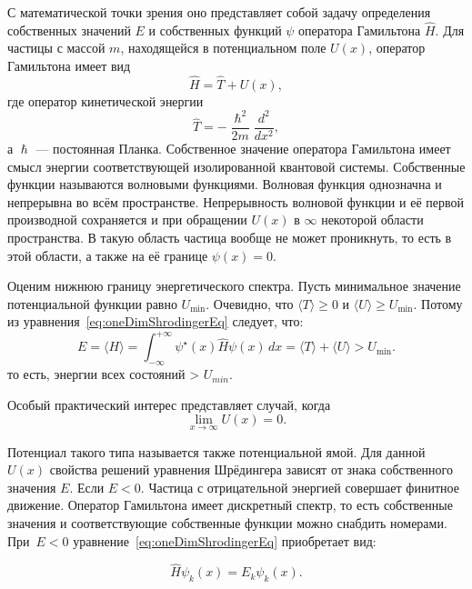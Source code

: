 \documentclass[a4paper,12pt]{article}
\begin{document}
С математической точки зрения оно представляет собой задачу определения собственных значений $E$ и собственных функций $\psi$ оператора Гамильтона $\hat{H}$.
Для частицы с массой $m$, находящейся в потенциальном поле $U(x)$, оператор Гамильтона имеет вид
\begin{equation}
    \hat{H} = \hat{T}+ U(x),
    \label{eq:gamilton_op}
\end{equation}
где оператор кинетической энергии
\begin{equation}
    \hat{T} =-\frac{\hslash^2}{2m}\frac{d^2}{dx^2},
    \label{eq:gamilton_kinetic_e_op}
\end{equation}
а $\hslash$ --- постоянная Планка.
Собственное значение оператора Гамильтона имеет смысл энергии соответствующей изолированной квантовой системы.
Собственные функции называются волновыми функциями.
Волновая функция однозначна и непрерывна во всём пространстве.
Непрерывность волновой функции и её первой производной сохраняется и при обращении $U(x)$ в $\infty$ некоторой области пространства.
В такую область частица вообще не может проникнуть, то есть в этой области, а также на её границе $\psi(x)=0$.

Оценим нижнюю границу энергетического спектра.
Пусть минимальное значение потенциальной функции равно $U_{\min}$.
Очевидно, что $\langle T \rangle \geq 0$ и $\langle U \rangle \geq U_{\min}$.
Потому из уравнения~\eqref{eq:oneDimShrodingerEq} следует, что:
\begin{equation}
    E =\langle H\rangle = \int_{-\infty}^{+\infty} \psi^\star(x)\hat{H}\psi(x) \,dx =\langle T\rangle +\langle U\rangle > U_{\min}.
\label{eq:e_h_integral}
\end{equation}
то есть, энергии всех состояний > $U_{min}$.

Особый практический интерес представляет случай, когда
\begin{equation}
    \lim_{x\to\infty} U(x) = 0.
\label{eq:limit_pot_inf}
\end{equation}

Потенциал такого типа называется также потенциальной ямой.
Для данной $U(x)$ свойства решений уравнения Шрёдингера зависят от знака собственного значения $E$.
Если $E < 0$.
Частица с отрицательной энергией совершает финитное движение.
Оператор Гамильтона имеет дискретный спектр, то есть собственные значения и соответствующие собственные функции можно снабдить номерами.
При~$E < 0$ уравнение~\eqref{eq:oneDimShrodingerEq} приобретает вид\cite{tim_shrod}:

\begin{equation}
    \hat{H}\psi_k(x) = E_k\psi_k(x).
    \label{eq:shrodinger_eq_e_less_0}
\end{equation}
\end{document}
